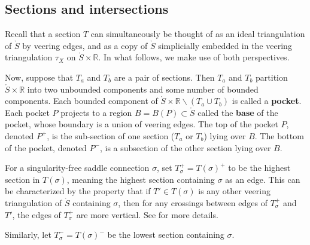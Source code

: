 \documentclass[11pt,letterpaper]{amsart}
\newcommand{\RR}[0]{\mathbb{R}}
\newcommand{\mr}{\mathring}
\numberwithin{equation}{section}
\theoremstyle{definition}
\newcommand{\define}[1]{\textbf{#1}}
\renewcommand{\setminus}{\smallsetminus}
\begin{document}
\subsection{Sections and intersections}\label{Sec:SectionsIntersections}
Recall that a section  $T$ can simultaneously be thought of as an ideal triangulation of $\mr S$ by veering edges, and as a copy of $\mr S$ simplicially embedded in 
the veering triangulation $\tau_X$ on $\mr S \times \RR$. In what follows, we make use of both perspectives.


Now, suppose that $T_a$ and $T_b$ are a pair of sections. Then $T_a$ and $T_b$ partition $\mr S \times \RR$ into two unbounded components and some number of bounded components. Each bounded component of $\mr S \times \RR \setminus (T_a \cup T_b)$ is called a \define{pocket}. Each pocket $P$ projects to a region $B = B(P) \subset \mr S$  called the \define{base} of the pocket, whose boundary is a union of veering edges. The top of the pocket $P$, denoted $P^+$, is the sub-section of one section ($T_a$ or $T_b$) lying over $B$. The bottom of the pocket, denoted $P^-$, is a subsection of the other section lying over $B$. 


For a singularity-free saddle connection $\sigma$, set $T^+_\sigma = T(\sigma)^+$ to be the highest section in $T(\sigma)$, meaning the highest section containing $\sigma$ as an edge. 
This can be characterized by the property that if $T' \in T(\sigma)$ is any other veering triangulation of $\mr S$ containing $\sigma$, then for any crossings between edges of $T^+_\sigma$ and $T'$, the edges of $T^+_\sigma$ are more vertical. See \cite[Section 3]{MinskyTaylor:FiberedFaces} for more details.

Similarly, let $T^-_\sigma = T(\sigma)^-$ be the lowest section containing $\sigma$.
\end{document}
